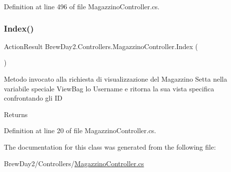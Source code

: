 Definition at line 496 of file Magazzino\+Controller.\+cs.

\mbox{\label{class_brew_day2_1_1_controllers_1_1_magazzino_controller_ab7b2e642a6b0cecd96d4882d3d4431bc}} 
\subsubsection{\texorpdfstring{Index()}{Index()}}
{\footnotesize\ttfamily Action\+Result Brew\+Day2.\+Controllers.\+Magazzino\+Controller.\+Index (\begin{DoxyParamCaption}{ }\end{DoxyParamCaption})}



Metodo invocato alla richiesta di visualizzazione del Magazzino Setta nella variabile speciale View\+Bag lo Username e ritorna la sua vista specifica confrontando gli ID 

\begin{DoxyReturn}{Returns}

\end{DoxyReturn}


Definition at line 20 of file Magazzino\+Controller.\+cs.



The documentation for this class was generated from the following file\+:\begin{DoxyCompactItemize}
\item 
Brew\+Day2/\+Controllers/\mbox{\hyperlink{_magazzino_controller_8cs}{Magazzino\+Controller.\+cs}}\end{DoxyCompactItemize}
